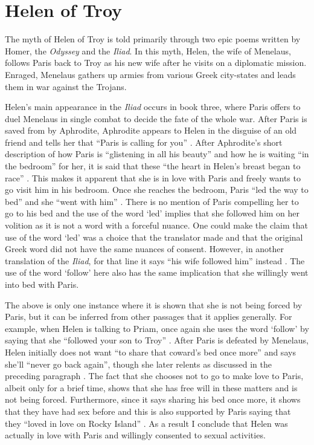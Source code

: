 \documentclass[11pt]{article}
\begin{document}
\section{Helen of Troy}
The myth of Helen of Troy is told primarily through two epic poems written by Homer, the \emph{Odyssey} and the \emph{Iliad}.
In this myth, Helen, the wife of Menelaus, follows Paris back to Troy as his new wife after he visits on a diplomatic mission.
Enraged, Menelaus gathers up armies from various Greek city-states and leads them in war against the Trojans.

Helen's main appearance in the \emph{Iliad} occurs in book three, where Paris offers to duel Menelaus in single combat to decide the fate of the whole war.
After Paris is saved from by Aphrodite, Aphrodite appears to Helen in the disguise of an old friend and tells her that ``Paris is calling for you'' \cite[book 3, line 450]{Iliad}.
After Aphrodite's short description of how Paris is ``glistening in all his beauty'' and how he is waiting ``in the bedroom'' for her, it is said that these ``the heart in Helen's breast began to race'' \cite[book 3, line 456]{Iliad}.
This makes it apparent that she is in love with Paris and freely wants to go visit him in his bedroom.
Once she reaches the bedroom, Paris ``led the way to bed'' and she ``went with him'' \cite[book 3, line 525]{Iliad}.
There is no mention of Paris compelling her to go to his bed and the use of the word `led' implies that she followed him on her volition as it is not a word with a forceful nuance.
One could make the claim that use of the word `led' was a choice that the translator made and that the original Greek word did not have the same nuances of consent.
However, in another translation of the \emph{Iliad}, for that line it says ``his wife followed him'' instead \cite[book 3, line 448]{Iliad-rieu}.
The use of the word `follow' here also has the same implication that she willingly went into bed with Paris.

The above is only one instance where it is shown that she is not being forced by Paris, but it can be inferred from other passages that it applies generally.
For example, when Helen is talking to Priam, once again she uses the word `follow' by saying that she ``followed your son to Troy'' \cite[book 3, line 210]{Iliad}.
After Paris is defeated by Menelaus, Helen initially does not want ``to share that coward's bed once more'' and says she'll ``never go back  again'', though she later relents as discussed in the preceding paragraph \cite[book 3, line 475]{Iliad}.
The fact that she chooses not to go to make love to Paris, albeit only for a brief time, shows that she has free will in these matters and is not being forced.
Furthermore, since it says sharing his bed once more, it shows that they have had sex before and this is also supported by Paris saying that they ``loved in love on Rocky Island'' \cite[book 3, line 522]{Iliad}.
As a result I conclude that Helen was actually in love with Paris and willingly consented to sexual activities.
\end{document}
